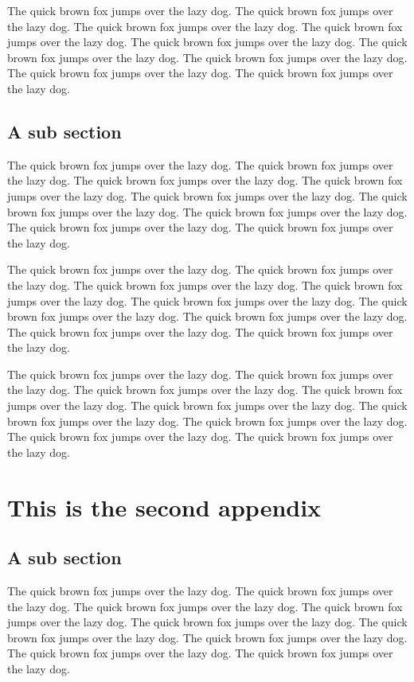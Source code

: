 \documentclass[openany,twoside,12pt]{book}
\theoremstyle{plain}
\numberwithin{equation}{chapter}
\numberwithin{figure}{chapter}
\numberwithin{table}{chapter}
\begin{document}
The quick brown fox jumps over the lazy dog. The quick brown fox jumps over the lazy dog. The quick brown fox jumps over the lazy dog. The quick brown fox jumps over the lazy dog. The quick brown fox jumps over the lazy dog. The quick brown fox jumps over the lazy dog. The quick brown fox jumps over the lazy dog. The quick brown fox jumps over the lazy dog. The quick brown fox jumps over the lazy dog.

\section{A sub section}

The quick brown fox jumps over the lazy dog. The quick brown fox jumps over the lazy dog. The quick brown fox jumps over the lazy dog. The quick brown fox jumps over the lazy dog. The quick brown fox jumps over the lazy dog. The quick brown fox jumps over the lazy dog. The quick brown fox jumps over the lazy dog. The quick brown fox jumps over the lazy dog. The quick brown fox jumps over the lazy dog.

The quick brown fox jumps over the lazy dog. The quick brown fox jumps over the lazy dog. The quick brown fox jumps over the lazy dog. The quick brown fox jumps over the lazy dog. The quick brown fox jumps over the lazy dog. The quick brown fox jumps over the lazy dog. The quick brown fox jumps over the lazy dog. The quick brown fox jumps over the lazy dog. The quick brown fox jumps over the lazy dog.

The quick brown fox jumps over the lazy dog. The quick brown fox jumps over the lazy dog. The quick brown fox jumps over the lazy dog. The quick brown fox jumps over the lazy dog. The quick brown fox jumps over the lazy dog. The quick brown fox jumps over the lazy dog. The quick brown fox jumps over the lazy dog. The quick brown fox jumps over the lazy dog. The quick brown fox jumps over the lazy dog.


\chapter{This is the second appendix}
\section{A sub section}

The quick brown fox jumps over the lazy dog. The quick brown fox jumps over the lazy dog. The quick brown fox jumps over the lazy dog. The quick brown fox jumps over the lazy dog. The quick brown fox jumps over the lazy dog. The quick brown fox jumps over the lazy dog. The quick brown fox jumps over the lazy dog. The quick brown fox jumps over the lazy dog. The quick brown fox jumps over the lazy dog.
\end{document}
